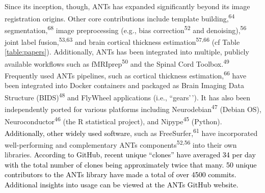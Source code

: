 \documentclass[
  12pt,
]{article}
\begin{document}
Since its inception, though, ANTs has expanded significantly beyond its
image registration origins. Other core contributions include template
building,\textsuperscript{64} segmentation,\textsuperscript{68} image
preprocessing (e.g., bias correction\textsuperscript{52} and
denoising),\textsuperscript{56} joint label
fusion,\textsuperscript{53,63} and brain cortical thickness
estimation\textsuperscript{57,66} (cf Table \ref{table:papers}).
Additionally, ANTs has been integrated into multiple, publicly available
workflows such as fMRIprep\textsuperscript{50} and the Spinal Cord
Toolbox.\textsuperscript{49} Frequently used ANTs pipelines, such as
cortical thickness estimation,\textsuperscript{66} have been integrated
into Docker containers and packaged as Brain Imaging Data Structure
(BIDS)\textsuperscript{48} and FlyWheel applications (i.e.,
``gears'\,'). It has also been independently ported for various
platforms including Neurodebian\textsuperscript{47} (Debian OS),
Neuroconductor\textsuperscript{46} (the R statistical project), and
Nipype\textsuperscript{45} (Python).
\textcolor{black}{Additionally, other widely
used software}, such as FreeSurfer,\textsuperscript{61} have
incorporated well-performing and complementary ANTs
components\textsuperscript{52,56} into their own libraries.
\textcolor{black}{According to GitHub, recent
unique “clones” have averaged 34 per day with the total number of clones being
approximately twice that many.  50 unique contributors to the ANTs library have
made a total of over 4500 commits. Additional insights into usage can be viewed
at the ANTs GitHub website.}


\end{document}
